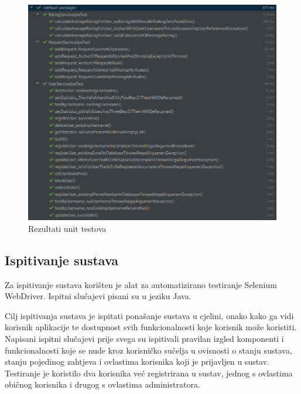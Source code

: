 			\bigskip
			\begin{figure}[H]
				\includegraphics[scale=0.8]{slike/unit_testovi.png}
				\centering
				\caption{Rezultati unit testova}
				
			\end{figure}
			
			
			\subsection{Ispitivanje sustava}
			
			Za ispitivanje sustava korišten je alat za automatizirano testiranje Selenium WebDriver. Ispitni slučajevi pisani
			su u jeziku Java. \newline
			
			Cilj ispitivanja sustava je ispitati ponašanje sustava u cjelini, onako kako ga vidi 
			korisnik aplikacije te dostupnost svih funkcionalnosti koje korisnik može koristiti.
			Napisani ispitni slučajevi prije svega su ispitivali pravilan izgled komponenti i funkcionalnosti koje se nude kroz korisničko sučelja
			u ovisnosti o stanju sustava, stanju pojedinog zahtjeva i ovlastima korisnika koji je prijavljen u sustav.
			Testiranje je koristilo dva korisnika već registrirana u sustav, jednog s ovlastima običnog korisnika i drugog s ovlastima administratora.\newline 
			
